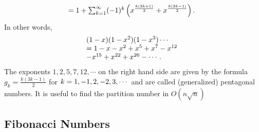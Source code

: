 \begin{enumerate}[resume]
\[\begin{array}{@{}l}
                  = 1 + \sum_{k=1}^{\infty} (-1)^k
                  \left(
                  x^{\frac{k(3k+1)}{2}} + x^{\frac{k(3k-1)}{2}}
                  \right).
              \end{array}
          \]
          In other words,
          \[
              \begin{array}{@{}l}
                  (1 - x)(1 - x^2)(1 - x^3)\cdots
                  \\ = 1 - x - x^2 + x^5 + x^7 - x^{12} \\ - x^{15} + x^{22} + x^{26} - \cdots .
              \end{array}
          \]
          The exponents $\displaystyle 1, 2, 5, 7, 12,\cdots$ on the right hand side are given by the formula $g_k = \frac{k(3k - 1)}{2}$ for $\displaystyle \displaystyle k = 1, -1, 2, -2, 3, \cdots$ and are called (generalized) pentagonal numbers.
          It is useful to find the partition number in $O(n \sqrt{n})$
\end{enumerate}

\subsection{Fibonacci Numbers}

